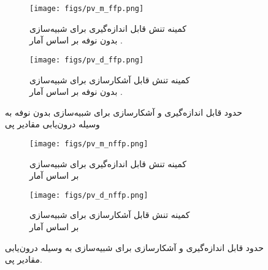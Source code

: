   	
  	\begin{figure}
  		\centering
  		\begin{subfigure}{0.5\textwidth}
  			\centering
  			\texttt{[image: figs/pv\_m\_ffp.png]}
  			\caption{   کمینه تنش قابل اندازه‌گیری برای شبیه‌سازی 
  				\\	 
  				بدون نوفه بر اساس آمار 
  				. }
  		\end{subfigure}%
  		\begin{subfigure}{0.5\textwidth}
  			\centering
  			\texttt{[image: figs/pv\_d\_ffp.png]}
  			\caption{  کمینه تنش قابل آشکارسازی برای شبیه‌سازی 
  				\\	 
  				بدون نوفه بر اساس آمار 
  				. }
  		\end{subfigure}
  		
  		\caption{حدود قابل اندازه‌گیری و آشکارسازی برای شبیه‌سازی 
  			بدون نوفه به وسیله درون‌یابی مقادیر پی}
  		\label{fig:ffp_pv}
  	\end{figure}
  	\begin{figure}
  		\centering
  		\begin{subfigure}{0.5\textwidth}
  			\centering
  			\texttt{[image: figs/pv\_m\_nffp.png]}
  			\caption{   کمینه تنش قابل اندازه‌گیری برای شبیه‌سازی 
  				\\	 
  				بر اساس آمار 
  				 }
  		\end{subfigure}%
  		\begin{subfigure}{0.5\textwidth}
  			\centering
  			\texttt{[image: figs/pv\_d\_nffp.png]}
  			\caption{  کمینه تنش قابل آشکارسازی برای شبیه‌سازی 
  				\\	 
  				بر اساس آمار 
  				 }
  		\end{subfigure}
  		
  		\caption{حدود قابل اندازه‌گیری و آشکارسازی برای شبیه‌سازی 
  			به وسیله درون‌یابی مقادیر پی.}
  		\label{fig:nffp_pv}
  	\end{figure}
